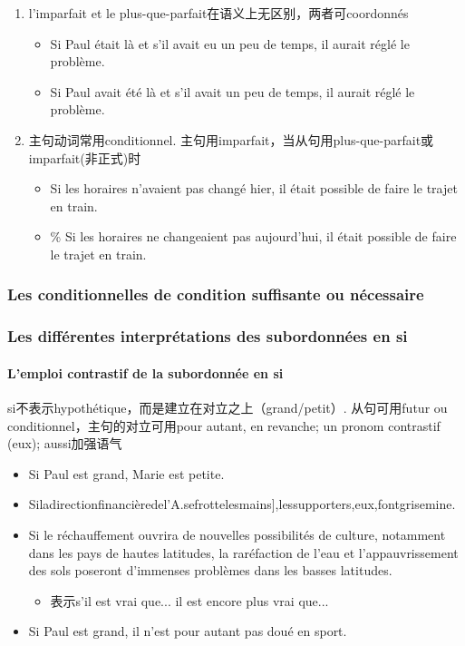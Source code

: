 \documentclass[UTF8]{report}
\begin{document}
\begin{enumerate}
    \item l’imparfait et le plus-que-parfait在语义上无区别，两者可coordonnés
    \begin{itemize}
        \item Si Paul était là et s’il avait eu un peu de temps, il aurait réglé le problème.
        \item Si Paul avait été là et s’il avait un peu de temps, il aurait réglé le problème.
    \end{itemize}
    \item 主句动词常用conditionnel. 主句用imparfait，当从句用plus-que-parfait或imparfait(非正式)时
    \begin{itemize}
        \item Si les horaires n’avaient pas changé hier, il était possible de faire le trajet en train.
        \item \% Si les horaires ne changeaient pas aujourd’hui, il était possible de faire le trajet en train.
    \end{itemize}
\end{enumerate}

\subsubsection{Les conditionnelles de condition suffisante ou nécessaire}

\subsubsection{Les différentes interprétations des subordonnées en si}
\paragraph{L’emploi contrastif de la subordonnée en si}
si不表示hypothétique，而是建立在对立之上（grand/petit）. 从句可用futur ou conditionnel，主句的对立可用pour autant, en revanche; un pronom contrastif (eux); aussi加强语气
\begin{itemize}
    \item Si Paul est grand, Marie est petite.
    \item Siladirectionfinancièredel’A.sefrottelesmains],lessupporters,eux,fontgrisemine.
    \item Si le réchauffement ouvrira de nouvelles possibilités de culture, notamment dans les pays de hautes latitudes, la raréfaction de l’eau et l’appauvrissement des sols poseront d’immenses problèmes dans les basses latitudes.
    \begin{itemize}
        \item 表示s’il est vrai que... il est encore plus vrai que...
    \end{itemize}
    \item Si Paul est grand, il n’est pour autant pas doué en sport.
\end{itemize}
\end{document}

